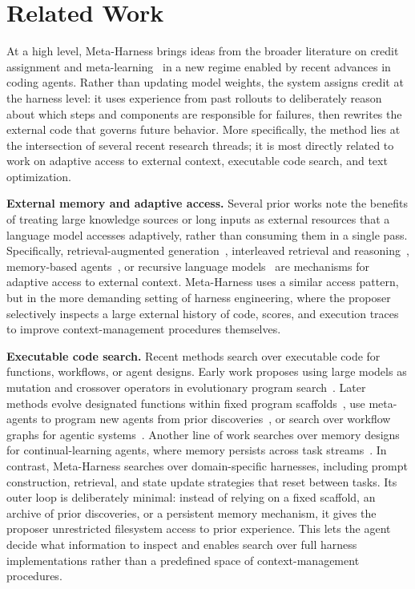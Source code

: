 \documentclass{article}
\begin{document}
\section{Related Work}
\label{sec:related-work}

At a high level, Meta-Harness brings ideas from the broader literature on credit assignment and meta-learning~\citep{schmidhuber1993self,thrun1998learning,andrychowicz2016learning,finn2017maml,snell2017prototypical,akyürek2023learningalgorithmincontextlearning} in a new regime enabled by recent advances in coding agents.
Rather than updating model weights, the system assigns credit at the harness level: it uses experience from past rollouts to deliberately reason about which steps and components are responsible for failures, then rewrites the external code that governs future behavior.
More specifically, the method lies at the intersection of several recent research threads; it is most directly related to work on adaptive access to external context, executable code search, and text optimization.



\textbf{External memory and adaptive access.}
Several prior works note the benefits of treating large knowledge sources or long inputs as external resources that a language model accesses adaptively, rather than consuming them in a single pass.
Specifically, retrieval-augmented generation~\citep{lewis2020retrieval}, interleaved retrieval and reasoning~\citep{trivedi2023interleavingretrievalchainofthoughtreasoning}, memory-based agents~\citep{packer2023memgpt}, or recursive language models~\citep{zhang2026recursivelanguagemodels} are mechanisms for adaptive access to external context.
Meta-Harness uses a similar access pattern, but in the more demanding setting of harness engineering, where the proposer selectively inspects a large external history of code, scores, and execution traces to improve context-management procedures themselves.

\textbf{Executable code search.} Recent methods search over executable code for functions, workflows, or agent designs.
Early work proposes using large models as mutation and crossover operators in evolutionary program search~\citep{lehman2022evolutionlargemodels}.
Later methods evolve designated functions within fixed program scaffolds~\citep{romera2024mathematical}, use meta-agents to program new agents from prior discoveries~\citep{hu2025automated}, or search over workflow graphs for agentic systems~\citep{zhang2025aflowautomatingagenticworkflow}.
Another line of work searches over memory designs for continual-learning agents, where memory persists across task streams~\citep{zhang2025memevolve,Xiong2026LearningTC}.
In contrast, Meta-Harness searches over domain-specific harnesses, including prompt construction, retrieval, and state update strategies that reset between tasks.
Its outer loop is deliberately minimal: instead of relying on a fixed scaffold, an archive of prior discoveries, or a persistent memory mechanism, it gives the proposer unrestricted filesystem access to prior experience.
This lets the agent decide what information to inspect and enables search over full harness implementations rather than a predefined space of context-management procedures.
\end{document}
